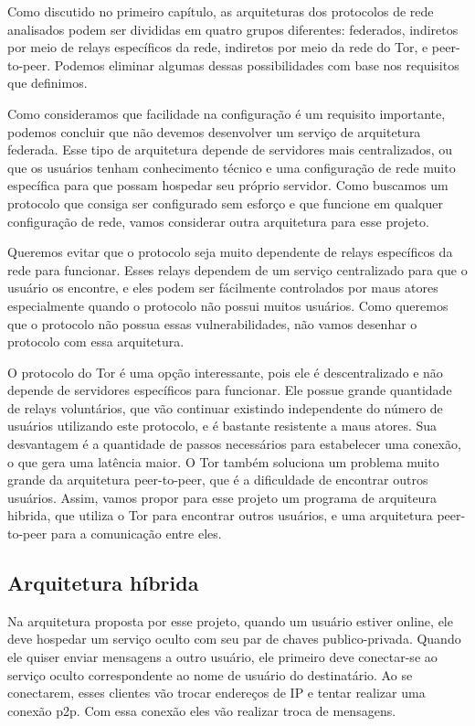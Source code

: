 Como discutido no primeiro capítulo, as arquiteturas dos protocolos de rede analisados podem ser divididas em quatro grupos diferentes: federados, indiretos por meio de relays específicos da rede, indiretos por meio da rede do Tor, e peer-to-peer. Podemos eliminar algumas dessas possibilidades com base nos requisitos que definimos.

Como consideramos que facilidade na configuração é um requisito importante, podemos concluir que não devemos desenvolver um serviço de arquitetura federada. Esse tipo de arquitetura depende de servidores mais centralizados, ou que os usuários tenham conhecimento técnico e uma configuração de rede muito específica para que possam hospedar seu próprio servidor. Como buscamos um protocolo que consiga ser configurado sem esforço e que funcione em qualquer configuração de rede, vamos considerar outra arquitetura para esse projeto.

Queremos evitar que o protocolo seja muito dependente de relays específicos da rede para funcionar. Esses relays dependem de um serviço centralizado para que o usuário os encontre, e eles podem ser fácilmente controlados por maus atores especialmente quando o protocolo não possui muitos usuários. Como queremos que o protocolo não possua essas vulnerabilidades, não vamos desenhar o protocolo com essa arquitetura.

O protocolo do Tor é uma opção interessante, pois ele é descentralizado e não depende de servidores específicos para funcionar. Ele possue grande quantidade de relays voluntários, que vão continuar existindo independente do número de usuários utilizando este protocolo, e é bastante resistente a maus atores. Sua desvantagem é a quantidade de passos necessários para estabelecer uma conexão, o que gera uma latência maior. O Tor também soluciona um problema muito grande da arquitetura peer-to-peer, que é a dificuldade de encontrar outros usuários. Assim, vamos propor para esse projeto um programa de arquiteura hibrida, que utiliza o Tor para encontrar outros usuários, e uma arquitetura peer-to-peer para a comunicação entre eles.

\subsection{Arquitetura híbrida}

Na arquitetura proposta por esse projeto, quando um usuário estiver online, ele deve hospedar um serviço oculto com seu par de chaves publico-privada. Quando ele quiser enviar mensagens a outro usuário, ele primeiro deve conectar-se ao serviço oculto correspondente ao nome de usuário do destinatário. Ao se conectarem, esses clientes vão trocar endereços de IP e tentar realizar uma conexão p2p. Com essa conexão eles vão realizar troca de mensagens.